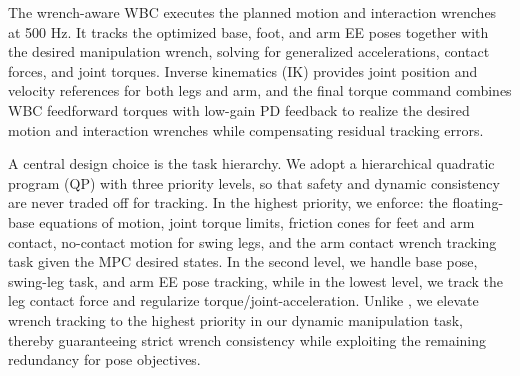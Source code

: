 The wrench-aware WBC executes the planned motion and interaction wrenches at 500 Hz.
It tracks the optimized base, foot, and arm EE poses together with the desired manipulation wrench, solving for generalized accelerations, contact forces, and joint torques. Inverse kinematics (IK) provides joint position and velocity references for both legs and arm, and the final torque command combines WBC feedforward torques with low-gain PD feedback to realize the desired motion and interaction wrenches while compensating residual tracking errors.

A central design choice is the task hierarchy. We adopt a hierarchical quadratic program (QP) \cite{bellicoso2019alma} with three priority levels, so that safety and dynamic consistency are never traded off for tracking. In the highest priority, we enforce: the floating-base equations of motion, joint torque limits, friction cones for feet and arm contact, no-contact motion for swing legs, and the arm contact wrench tracking task given the MPC desired states. In the second level, we handle base pose, swing-leg task, and arm EE pose tracking, while in the lowest level, we track the leg contact force and regularize torque/joint-acceleration. Unlike \cite{bellicoso2019alma}, we elevate wrench tracking to the highest priority in our dynamic manipulation task, thereby guaranteeing strict wrench consistency while exploiting the remaining redundancy for pose objectives.



